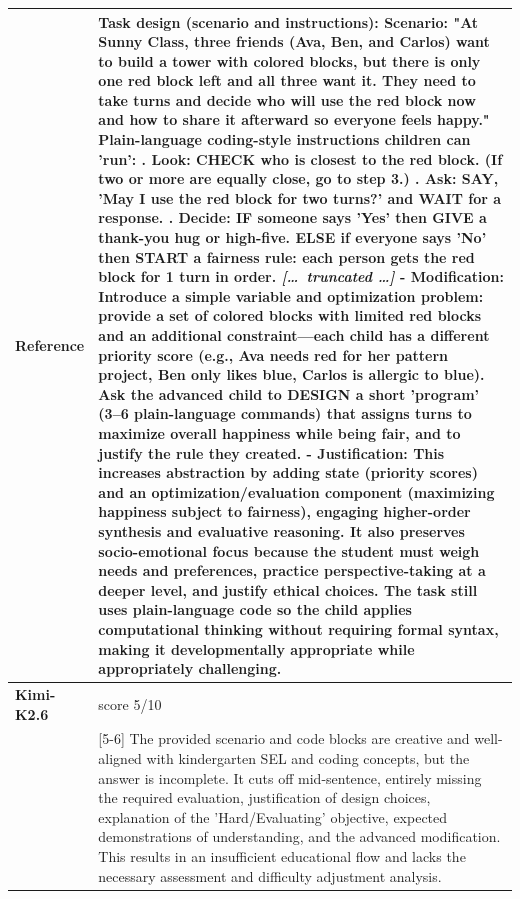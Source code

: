 \begin{longtable}{@{}l p{12.5cm}@{}}
  \textbf{Reference} & Task design (scenario and instructions): \newline Scenario: "At Sunny Class, three friends (Ava, Ben, and Carlos) want to build a tower with colored blocks, but there is only one red block left and all three want it. They need to take turns and decide who will use the red block now and how to share it afterward so everyone feels happy." \newline Plain-language coding-style instructions children can 'run': \newline 1. Look: CHECK who is closest to the red block. (If two or more are equally close, go to step 3.) \newline 2. Ask: SAY, 'May I use the red block for two turns?' and WAIT for a response. \newline 3. Decide: IF someone says 'Yes' then GIVE a thank-you hug or high-five. ELSE if everyone says 'No' then START a fairness rule: each person gets the red block for 1 turn in order. \newline \textit{[\ldots\ truncated \ldots]} \newline - Modification: Introduce a simple variable and optimization problem: provide a set of colored blocks with limited red blocks and an additional constraint---each child has a different priority score (e.g., Ava needs red for her pattern project, Ben only likes blue, Carlos is allergic to blue). Ask the advanced child to DESIGN a short 'program' (3--6 plain-language commands) that assigns turns to maximize overall happiness while being fair, and to justify the rule they created. \newline - Justification: This increases abstraction by adding state (priority scores) and an optimization/evaluation component (maximizing happiness subject to fairness), engaging higher-order synthesis and evaluative reasoning. It also preserves socio-emotional focus because the student must weigh needs and preferences, practice perspective-taking at a deeper level, and justify ethical choices. The task still uses plain-language code so the child applies computational thinking without requiring formal syntax, making it developmentally appropriate while appropriately challenging. \\
  \midrule
  \textbf{Kimi-K2.6} & score 5/10 \\
  & [5-6] The provided scenario and code blocks are creative and well-aligned with kindergarten SEL and coding concepts, but the answer is incomplete. It cuts off mid-sentence, entirely missing the required evaluation, justification of design choices, explanation of the 'Hard/Evaluating' objective, expected demonstrations of understanding, and the advanced modification. This results in an insufficient educational flow and lacks the necessary assessment and difficulty adjustment analysis. \\

\end{longtable}

